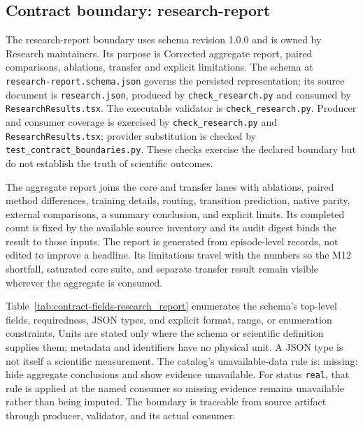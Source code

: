 \subsection{Contract boundary: research-report}\label{sec:contract-research_report}
The research-report boundary uses schema revision 1.0.0 and is owned by Research maintainers. Its purpose is Corrected aggregate report, paired comparisons, ablations, transfer and explicit limitations. The schema at \texttt{research-report.schema.json} governs the persisted representation; its source document is \texttt{research.json}, produced by \texttt{check\_\allowbreak{}research.py} and consumed by \texttt{Research\allowbreak{}Results.tsx}. The executable validator is \texttt{check\_\allowbreak{}research.py}. Producer and consumer coverage is exercised by \texttt{check\_\allowbreak{}research.py} and \texttt{Research\allowbreak{}Results.tsx}; provider substitution is checked by \texttt{test\_\allowbreak{}contract\_\allowbreak{}boundaries.py}. These checks exercise the declared boundary but do not establish the truth of scientific outcomes.

The aggregate report joins the core and transfer lanes with ablations, paired method differences, training details, routing, transition prediction, native parity, external comparisons, a summary conclusion, and explicit limits. Its completed count is fixed by the available source inventory and its audit digest binds the result to those inputs. The report is generated from episode-level records, not edited to improve a headline. Its limitations travel with the numbers so the M12 shortfall, saturated core suite, and separate transfer result remain visible wherever the aggregate is consumed.

Table~\ref{tab:contract-fields-research_report} enumerates the schema's top-level fields, requiredness, JSON types, and explicit format, range, or enumeration constraints. Units are stated only where the schema or scientific definition supplies them; metadata and identifiers have no physical unit. A JSON type is not itself a scientific measurement. The catalog's unavailable-data rule is: missing: hide aggregate conclusions and show evidence unavailable. For status \texttt{real}, that rule is applied at the named consumer so missing evidence remains unavailable rather than being imputed. The boundary is traceable from source artifact through producer, validator, and its actual consumer.

